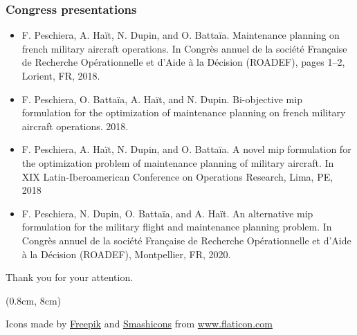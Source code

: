 \begin{frame}
\frametitle{\textbf{Congress presentations}}

  \begin{itemize}
    \item F. Peschiera, A. Haït, N. Dupin, and O. Battaïa. Maintenance planning on french military aircraft operations. In Congrès annuel de la société Française de Recherche Opérationnelle et d’Aide à la Décision (ROADEF), pages 1–2, Lorient, FR, 2018.

    \item F. Peschiera, O. Battaïa, A. Haït, and N. Dupin. Bi-objective mip formulation for the  optimization of maintenance planning on french military aircraft operations. 2018. 
    
    \item F. Peschiera, A. Haït, N. Dupin, and O. Battaïa. A novel mip formulation for the optimization problem of maintenance planning of military aircraft. In XIX Latin-Iberoamerican Conference on Operations Research, Lima, PE, 2018
    
    \item F. Peschiera, N. Dupin, O. Battaïa, and A. Haït. An alternative mip formulation for the military flight and maintenance planning problem. In Congrès annuel de la société Française de Recherche Opérationnelle et d’Aide à la Décision (ROADEF), Montpellier, FR, 2020.

  \end{itemize}

\end{frame}

\begin{frame}
  \centering
  \vspace{2em}
  Thank you for your attention.

  \begin{textblock*}{1.1\textwidth}(0.8cm, 8cm)
    \begin{flushleft}
    \citesize Icons made by \href{http://www.freepik.com/}{Freepik} and \href{https://smashicons.com/}{Smashicons} from \url{www.flaticon.com}
    \end{flushleft}
  \end{textblock*}

\end{frame}